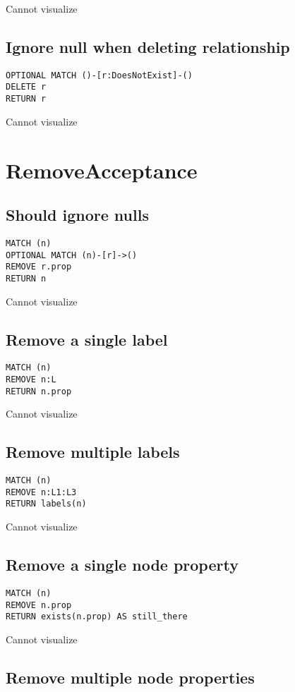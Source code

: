Cannot visualize
\subsection{Ignore null when deleting relationship}

\begin{lstlisting}
OPTIONAL MATCH ()-[r:DoesNotExist]-()
DELETE r
RETURN r
\end{lstlisting}

Cannot visualize
\section{RemoveAcceptance}

\subsection{Should ignore nulls}

\begin{lstlisting}
MATCH (n)
OPTIONAL MATCH (n)-[r]->()
REMOVE r.prop
RETURN n
\end{lstlisting}

Cannot visualize
\subsection{Remove a single label}

\begin{lstlisting}
MATCH (n)
REMOVE n:L
RETURN n.prop
\end{lstlisting}

Cannot visualize
\subsection{Remove multiple labels}

\begin{lstlisting}
MATCH (n)
REMOVE n:L1:L3
RETURN labels(n)
\end{lstlisting}

Cannot visualize
\subsection{Remove a single node property}

\begin{lstlisting}
MATCH (n)
REMOVE n.prop
RETURN exists(n.prop) AS still_there
\end{lstlisting}

Cannot visualize
\subsection{Remove multiple node properties}

